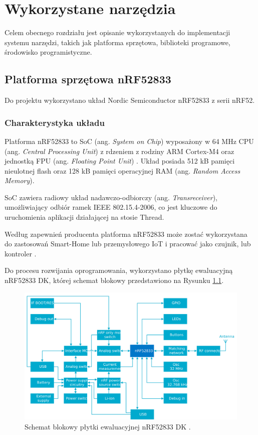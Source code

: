\chapter{Wykorzystane narzędzia}
\label{cha:narzedzia}

Celem obecnego rozdziału jest opisanie wykorzystanych do implementacji systemu narzędzi, takich jak platforma sprzętowa, biblioteki programowe, środowisko programistyczne.

\section{Platforma sprzętowa nRF52833}

Do projektu wykorzystano układ Nordic Semiconductor nRF52833 z serii nRF52.

\subsection{Charakterystyka układu}

    Platforma nRF52833 to SoC (ang. \textit{System on Chip}) wyposażony w 64 MHz CPU (ang. \textit{Central Processing Unit}) z rdzeniem z rodziny ARM Cortex-M4 oraz jednostką FPU (ang. \textit{Floating Point Unit}) \cite{nrf52833-characteristics}.
    Układ posiada 512 kB pamięci nieulotnej flash oraz 128 kB pamięci operacyjnej RAM (ang. \textit{Random Access Memory}).

    SoC zawiera radiowy układ nadawczo-odbiorczy (ang. \textit{Transreceiver}), umożliwiający odbiór ramek IEEE 802.15.4-2006, co jest kluczowe do uruchomienia aplikacji działającej na stosie Thread.

    Według zapewnień producenta platforma nRF52833 może zostać wykorzystana do zastosowań Smart-Home lub przemysłowego IoT i pracować jako czujnik, lub kontroler \cite{nrf52833-characteristics}.

    Do procesu rozwijania oprogramowania, wykorzystano płytkę ewaluacyjną nRF52833 DK, której schemat blokowy przedstawiono na Rysunku \ref{fig:nrf8233-block-diagram}.

    \begin{figure}[H]
        \centering
        \includegraphics[width=0.8\linewidth]{graphics/external/nrf52833DK_block_diagram.jpg}
        \caption{Schemat blokowy płytki ewaluacyjnej nRF52833 DK \cite{nrf52833-diagram}.}
        \label{fig:nrf8233-block-diagram}
    \end{figure}

